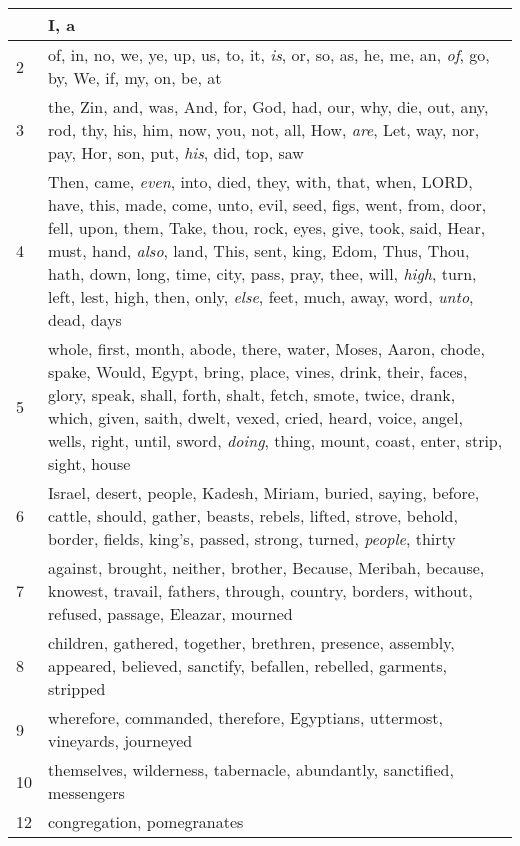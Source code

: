 \begin{longtable}{l|p{3.75in}}
\hline \hline
\endlastfoot
1 & I, a \\ \hline
2 & of, in, no, we, ye, up, us, to, it, \emph{is}, or, so, as, he, me, an, \emph{of}, go, by, We, if, my, on, be, at \\ \hline
3 & the, Zin, and, was, And, for, God, had, our, why, die, out, any, rod, thy, his, him, now, you, not, all, How, \emph{are}, Let, way, nor, pay, Hor, son, put, \emph{his}, did, top, saw \\ \hline
4 & Then, came, \emph{even}, into, died, they, with, that, when, LORD, have, this, made, come, unto, evil, seed, figs, went, from, door, fell, upon, them, Take, thou, rock, eyes, give, took, said, Hear, must, hand, \emph{also}, land, This, sent, king, Edom, Thus, Thou, hath, down, long, time, city, pass, pray, thee, will, \emph{high}, turn, left, lest, high, then, only, \emph{else}, feet, much, away, word, \emph{unto}, dead, days \\ \hline
5 & whole, first, month, abode, there, water, Moses, Aaron, chode, spake, Would, Egypt, bring, place, vines, drink, their, faces, glory, speak, shall, forth, shalt, fetch, smote, twice, drank, which, given, saith, dwelt, vexed, cried, heard, voice, angel, wells, right, until, sword, \emph{doing}, thing, mount, coast, enter, strip, sight, house \\ \hline
6 & Israel, desert, people, Kadesh, Miriam, buried, saying, before, cattle, should, gather, beasts, rebels, lifted, strove, behold, border, fields, king's, passed, strong, turned, \emph{people}, thirty \\ \hline
7 & against, brought, neither, brother, Because, Meribah, because, knowest, travail, fathers, through, country, borders, without, refused, passage, Eleazar, mourned \\ \hline
8 & children, gathered, together, brethren, presence, assembly, appeared, believed, sanctify, befallen, rebelled, garments, stripped \\ \hline
9 & wherefore, commanded, therefore, Egyptians, uttermost, vineyards, journeyed \\ \hline
10 & themselves, wilderness, tabernacle, abundantly, sanctified, messengers \\ \hline
12 & congregation, pomegranates \\ \hline
\end{longtable}






 



